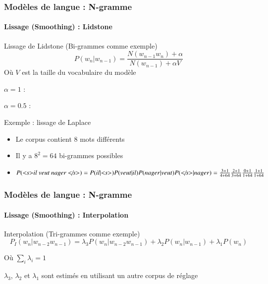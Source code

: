 \documentclass[xcolor=table]{beamer}
\begin{document}
\begin{frame}
\frametitle{Modèles de langue : N-gramme}
\framesubtitle{Lissage (Smoothing) : Lidstone}

\begin{block}{Lissage de Lidstone (Bi-grammes comme exemple)}
	\[%
	P(w_n | w_{n-1}) = \frac{N(w_{n-1} w_n) + \alpha}{N(w_{n-1}) + \alpha V}
	\]
	Où $V$ est la taille du vocabulaire du modèle
	
	$\alpha = 1$ :  
	
	$\alpha = 0.5$ : 
\end{block}

\begin{exampleblock}{Exemple : lissage de Laplace}
	\begin{itemize}
		\item Le corpus contient 8 mots différents
		\item Il y a  $8^2 = 64$ bi-grammes possibles
		\item $P(\text{\textit{\textless s\textgreater il veut nager \textless/s\textgreater}}) = 
		P(il|\text{\textit{\textless s\textgreater}}) P(veut|il) P(nager|veut)  P(\text{\textit{\textless/s\textgreater}}|nager) = 
		\frac{3 + 1}{4 + 64} \frac{2 + 1}{3 + 64} \frac{0 + 1}{1 + 64} \frac{1 + 1}{1 + 64} $
	\end{itemize}
\end{exampleblock}

\end{frame}

\begin{frame}
\frametitle{Modèles de langue : N-gramme}
\framesubtitle{Lissage (Smoothing) : Interpolation}

\begin{block}{Interpolation (Tri-grammes comme exemple)}
	\[%
	P_{I}(w_n | w_{n-2} w_{n-1}) = 
	\lambda_3 P(w_n | w_{n-2} w_{n-1}) 
	+ \lambda_2 P(w_n | w_{n-1}) 
	+ \lambda_1 P(w_n) 
	\]
	
	Où $\sum_i \lambda_i = 1$
	
	$\lambda_3$, $\lambda_2$ et $\lambda_1$ sont estimés en utilisant un autre corpus de réglage
\end{block}


\end{frame}
\end{document}

